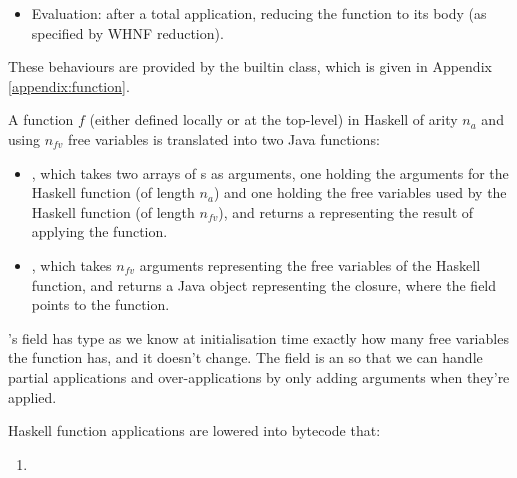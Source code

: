\documentclass[dissertation.tex]{subfiles}
\begin{document}
{{{\begin{itemize}
{            }
            \item
            {
                Evaluation: after a total application, reducing the function to its body (as specified by WHNF
                reduction).
            }
            \end{itemize}

            These behaviours are provided by the  builtin class, which is given in Appendix
            \ref{appendix:function}.


            A function \(f\) (either defined locally or at the top-level) in Haskell of arity \(n_a\) and using
            \(n_{fv}\) free variables is translated into two Java functions:
            
            \begin{itemize}
            \item
            {
                
                , which takes two arrays of s as arguments, one holding the
                arguments for the Haskell function (of length \(n_a\)) and one holding the free variables used by
                the Haskell function (of length \(n_{fv}\)), and returns a  representing the result
                of applying the function.

            }
            \item
            {

                , which takes \(n_{fv}\) arguments representing the free variables of the
                Haskell function, and returns a Java  object representing the closure, where the
                 field points to the  function.

            }
            \end{itemize}
            
            's  field has type  as we know at initialisation
            time exactly how many free variables the function has, and it doesn't change. The  field
            is an  so that we can handle partial applications and over-applications by
            only adding arguments when they're applied.

            Haskell function applications are lowered into bytecode that:
            \begin{enumerate}
            \item
            {

}
\end{enumerate}}}}
\end{document}
